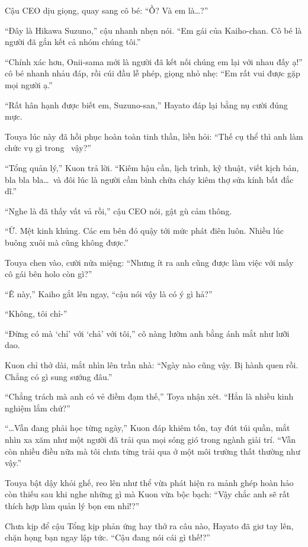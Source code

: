 \documentclass[../main.tex]{subfiles}
\begin{document}
Cậu CEO dịu giọng, quay sang cô bé: ``Ồ? Và em là\dots?''

``Đây là Hikawa Suzuno,'' cậu nhanh nhẹn nói. ``Em gái của Kaiho-chan. Cô bé là người đã gắn kết cả nhóm chúng tôi.''

``Chính xác hơn, Onii-sama mới là người đã kết nối chúng em lại với nhau đấy ạ!'' cô bé nhanh nhảu đáp, rồi cúi đầu lễ phép, giọng nhỏ nhẹ: ``Em rất vui được gặp mọi người ạ.''

``Rất hân hạnh được biết em, Suzuno-san,'' Hayato đáp lại bằng nụ cười đúng mực.

Touya lúc này đã hồi phục hoàn toàn tinh thần, liền hỏi: ``Thế cụ thể thì anh làm chức vụ gì trong \hll\ vậy?''

``Tổng quản lý,'' Kuon trả lời. ``Kiêm hậu cần, lịch trình, kỹ thuật, viết kịch bản, bla bla bla\dots\ và đôi lúc là người cầm bình chữa cháy kiêm thợ sửa kính bất đắc dĩ.''

``Nghe là đã thấy vất vả rồi,'' cậu CEO nói, gật gù cảm thông.

``Ừ. Mệt kinh khủng. Các em bên đó quậy tới mức phát điên luôn. Nhiều lúc buông xuôi mà cũng không được.''

Touya chen vào, cười nửa miệng: ``Nhưng ít ra anh cũng được làm việc với mấy cô gái bên holo còn gì?''

``Ê này,'' Kaiho gắt lên ngay, ``cậu nói vậy là có ý gì hả?''

``Không, tôi chỉ-''

``Đừng có mà `chỉ' với `chả' với tôi,'' cô nàng lườm anh bằng ánh mắt như lưỡi dao.

Kuon chỉ thở dài, mắt nhìn lên trần nhà: ``Ngày nào cũng vậy. Bị hành quen rồi. Chẳng có gì sung sướng đâu.''

``Chẳng trách mà anh có vẻ điềm đạm thế,'' Toya nhận xét. ``Hẳn là nhiều kinh nghiệm lắm chứ?''

``\dots Vẫn đang phải học từng ngày,'' Kuon đáp khiêm tốn, tay đút túi quần, mắt nhìn xa xăm như một người đã trải qua mọi sóng gió trong ngành giải trí. ``Vẫn còn nhiều điều nữa mà tôi chưa từng trải qua ở một môi trường thất thường như vậy.''

Touya bật dậy khỏi ghế, reo lên như thể vừa phát hiện ra mảnh ghép hoàn hảo còn thiếu sau khi nghe những gì mà Kuon vừa bộc bạch: ``Vậy chắc anh sẽ rất thích hợp làm quản lý bọn em nhỉ!?''

Chưa kịp để cậu Tổng kịp phản ứng hay thở ra câu nào, Hayato đã giơ tay lên, chặn họng bạn ngay lập tức. ``Cậu đang nói cái gì thế!?''
\end{document}
